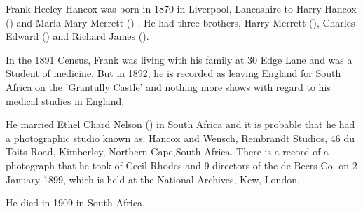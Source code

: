 
Frank Heeley Hancox was born in 1870 in Liverpool, Lancashire to Harry Hancox () and Maria Mary Merrett () \cite{FHHancoxBirth}. He had three brothers, Harry Merrett (), Charles Edward () and Richard James ().

In the 1891 Census, Frank was living with his family at 30 Edge Lane and was a Student of medicine.\cite{FrankHeeleyHancoxResidenceUK}  But in 1892, he is recorded as leaving England for South Africa on the 'Grantully Castle' \cite{FHHancoxTravel} and nothing more shows with regard to his medical studies in England. 

He married Ethel Chard Nelson () in South Africa and it is probable that he had a photographic studio known as: Hancox and Wensch, Rembrandt Studios, 46 du Toits Road, Kimberley, Northern Cape,South Africa. There is a record of a photograph that he took of Cecil Rhodes and 9 directors of the de Beers Co. on 2 January 1899, which is held at the National Archives, Kew, London.  \cite{FHHancoxPhotos}

He died in 1909 in South Africa. \cite{FHHancoxDeath}
